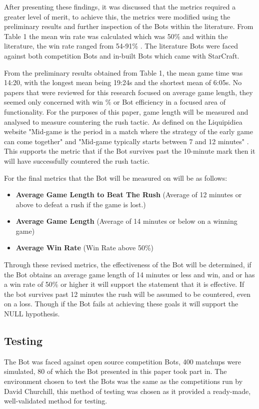 \documentclass[journal]{IEEEtran}
\begin{document}
	After presenting these findings, it was discussed that the metrics required a greater level of merit, to achieve this, the metrics were modified using the preliminary results and further inspection of the Bots within the literature. From Table 1 the mean win rate was calculated which was 50\% and within the literature, the win rate ranged from 54-91\% \cite{ELGoal,Swen,OnlineEvo,GoalDriven}. The literature Bots were faced against both competition Bots and in-built Bots which came with StarCraft.
	
	From the preliminary results obtained from Table 1, the mean game time was 14:20, with the longest mean being 19:24s and the shortest mean of 6:05s. No papers that were reviewed for this research focused on average game length, they seemed only concerned with win \% or Bot efficiency in a focused area of functionality. For the purposes of this paper, game length will be measured and analysed to measure countering the rush tactic. As defined on the Liquipidiea website "Mid-game is the period in a match where the strategy of the early game can come together" and "Mid-game typically starts between 7 and 12 minutes" \cite{Liqui}. This supports the metric that if the Bot survives past the 10-minute mark then it will have successfully countered the rush tactic. 
	\newline
	
	For the final metrics that the Bot will be measured on will be as follows:
	\begin{itemize}
		\item \textbf{Average Game Length to Beat The Rush} (Average of 12 minutes or above to defeat a rush if the game is lost.)
		\item \textbf{Average Game Length} (Average of 14 minutes or below on a winning game)
		\item \textbf{Average Win Rate} (Win Rate above 50\%)
	\end{itemize}
	
	Through these revised metrics, the effectiveness of the Bot will be determined, if the Bot obtains an average game length of 14 minutes or less and win, and or has a win rate of 50\% or higher it will support the statement that it is effective. If the bot survives past 12 minutes the rush will be assumed to be countered, even on a loss. Though if the Bot fails at achieving these goals it will support the NULL hypothesis.
	
	\subsection{Testing}
	The Bot was faced against open source competition Bots, 400 matchups were simulated, 80 of which the Bot presented in this paper took part in. The environment chosen to test the Bots was the same as the competitions run by David Churchill, this method of testing was chosen as it provided a ready-made, well-validated method for testing.
	
\end{document}
